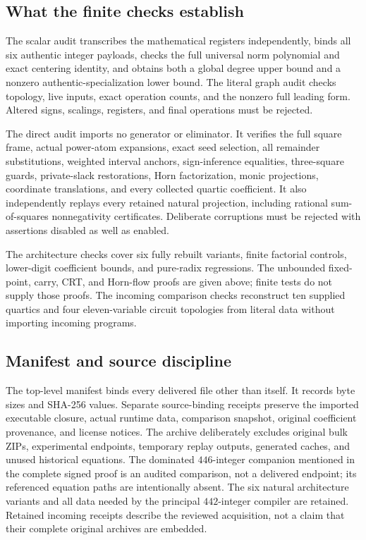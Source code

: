 \subsection{What the finite checks establish}
The scalar audit transcribes the mathematical registers independently, binds all six authentic integer payloads, checks the full universal norm polynomial and exact centering identity, and obtains both a global degree upper bound and a nonzero authentic-specialization lower bound. The literal graph audit checks topology, live inputs, exact operation counts, and the nonzero full leading form. Altered signs, scalings, registers, and final operations must be rejected.

The direct audit imports no generator or eliminator. It verifies the full square frame, actual power-atom expansions, exact seed selection, all remainder substitutions, weighted interval anchors, sign-inference equalities, three-square guards, private-slack restorations, Horn factorization, monic projections, coordinate translations, and every collected quartic coefficient. It also independently replays every retained natural projection, including rational sum-of-squares nonnegativity certificates. Deliberate corruptions must be rejected with assertions disabled as well as enabled.

The architecture checks cover six fully rebuilt variants, finite factorial controls, lower-digit coefficient bounds, and pure-radix regressions. The unbounded fixed-point, carry, CRT, and Horn-flow proofs are given above; finite tests do not supply those proofs. The incoming comparison checks reconstruct ten supplied quartics and four eleven-variable circuit topologies from literal data without importing incoming programs.

\subsection{Manifest and source discipline}
The top-level manifest binds every delivered file other than itself. It records byte sizes and SHA-256 values. Separate source-binding receipts preserve the imported executable closure, actual runtime data, comparison snapshot, original coefficient provenance, and license notices. The archive deliberately excludes original bulk ZIPs, experimental endpoints, temporary replay outputs, generated caches, and unused historical equations. The dominated $446$-integer companion mentioned in the complete signed proof is an audited comparison, not a delivered endpoint; its referenced equation paths are intentionally absent. The six natural architecture variants and all data needed by the principal $442$-integer compiler are retained. Retained incoming receipts describe the reviewed acquisition, not a claim that their complete original archives are embedded.

